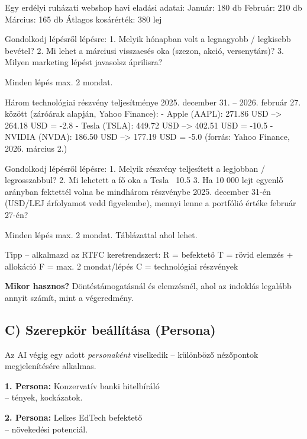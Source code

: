 \documentclass[11pt,a4paper]{article}
\newcommand{\tip}[1]{%
  \vspace{3pt}%
  \begin{tcolorbox}[tipstyle]%
  \textbf{\textcolor{tipborder}{Mikor hasznos?}} #1%
  \end{tcolorbox}\vspace{2pt}}
\newcommand{\lbl}[1]{\vspace{6pt}\noindent{\small\bfseries\textcolor{labelcolor}{#1}}\par\smallskip}
\begin{document}
\begin{prompt}
Egy erdélyi ruházati webshop havi eladási adatai:
Január: 180 db   Február: 210 db   Március: 165 db
Átlagos kosárérték: 380 lej

Gondolkodj lépésről lépésre:
1. Melyik hónapban volt a legnagyobb / legkisebb bevétel?
2. Mi lehet a márciusi visszaesés oka (szezon, akció, versenytárs)?
3. Milyen marketing lépést javasolsz áprilisra?

Minden lépés max. 2 mondat.
\end{prompt}

\lbl{Alternatív feladat -- részvényelemzés}

\begin{prompt}
Három technológiai részvény teljesítménye 2025. december 31. --
2026. február 27. között (záróárak alapján, Yahoo Finance):
- Apple (AAPL):  271.86 USD --> 264.18 USD = -2.8%
- Tesla (TSLA):  449.72 USD --> 402.51 USD = -10.5%
- NVIDIA (NVDA): 186.50 USD --> 177.19 USD = -5.0%
(forrás: Yahoo Finance, 2026. március 2.)

Gondolkodj lépésről lépésre:
1. Melyik részvény teljesített a legjobban / legrosszabbul?
2. Mi lehetett a fő oka a Tesla ~10.5%
3. Ha 10 000 lejt egyenlő arányban fektettél volna be mindhárom
   részvénybe 2025. december 31-én (USD/LEJ árfolyamot vedd
   figyelembe), mennyi lenne a portfólió értéke február 27-én?

Minden lépés max. 2 mondat. Táblázattal ahol lehet.

Tipp -- alkalmazd az RTFC keretrendszert:
R = befektető
T = rövid elemzés + allokáció
F = max. 2 mondat/lépés
C = technológiai részvények
\end{prompt}

\tip{Döntéstámogatásnál és elemzésnél, ahol az indoklás legalább annyit számít, mint a végeredmény.}

\subsection{C) Szerepkör beállítása (Persona)}

Az AI végig egy adott \textit{personaként} viselkedik – különböző nézőpontok megjelenítésére alkalmas.

\medskip
\noindent\textbf{1. Persona:} Konzervatív banki hitelbíráló\\
-- tények, kockázatok.

\noindent\textbf{2. Persona:} Lelkes EdTech befektető\\
-- növekedési potenciál.
\end{document}
